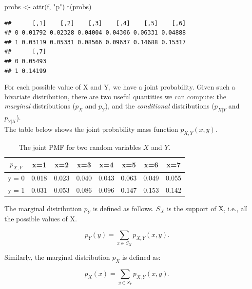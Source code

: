 \documentclass[
  12pt,
]{krantz}
\newenvironment{Shaded}{\begin{snugshade}}{\end{snugshade}}
\newcommand{\FunctionTok}[1]{\textcolor[rgb]{0.00,0.00,0.00}{#1}}
\newcommand{\NormalTok}[1]{#1}
\newcommand{\OtherTok}[1]{\textcolor[rgb]{0.56,0.35,0.01}{#1}}
\newcommand{\StringTok}[1]{\textcolor[rgb]{0.31,0.60,0.02}{#1}}
\theoremstyle{definition}
\theoremstyle{definition}
\theoremstyle{definition}
\theoremstyle{definition}
\theoremstyle{remark}
\begin{document}
\begin{Shaded}
\begin{Highlighting}[]
\NormalTok{probs }\OtherTok{\textless{}{-}} \FunctionTok{attr}\NormalTok{(f, }\StringTok{"p"}\NormalTok{)}
\FunctionTok{t}\NormalTok{(probs)}
\end{Highlighting}
\end{Shaded}

\begin{verbatim}
##      [,1]    [,2]    [,3]    [,4]    [,5]    [,6]
## 0 0.01792 0.02328 0.04004 0.04306 0.06331 0.04888
## 1 0.03119 0.05331 0.08566 0.09637 0.14688 0.15317
##      [,7]
## 0 0.05493
## 1 0.14199
\end{verbatim}

For each possible value of X and Y, we have a joint probability. Given such a bivariate distribution, there are two useful quantities we can compute: the \emph{marginal} distributions (\(p_{X}\) and \(p_Y\)), and the \emph{conditional} distributions (\(p_{X|Y}\) and \(p_{Y|X}\)).\\
The table below shows the joint probability mass function \(p_{X,Y}(x,y)\).

\begin{table}[!htbp] 
\begin{center}
\begin{tabular}{c|ccccccc}
$p_{X,Y}$ & x=1 & x=2 & x=3 & x=4 & x=5 & x=6 & x=7\\
\hline
y = 0 & 0.018 & 0.023 & 0.040 & 0.043 & 0.063 & 0.049 & 0.055\\
y = 1 & 0.031 & 0.053 & 0.086 & 0.096 &  0.147 & 0.153 &  0.142\\
\end{tabular}
\end{center}
\caption{The joint PMF for two random variables $X$ and $Y$.}\label{discretebivartable}
\end{table}

The marginal distribution \(p_Y\) is defined as follows. \(S_{X}\) is the support of X, i.e., all the possible values of X.

\begin{equation}
p_{Y}(y)=\sum_{x\in S_{X}}p_{X,Y}(x,y).\label{eq-marginal-pmf}
\end{equation}

Similarly, the marginal distribution \(p_X\) is defined as:

\begin{equation}
p_{X}(x)=\sum_{y\in S_{Y}}p_{X,Y}(x,y).\label{eq-marginal-pmf2}
\end{equation}
\end{document}
